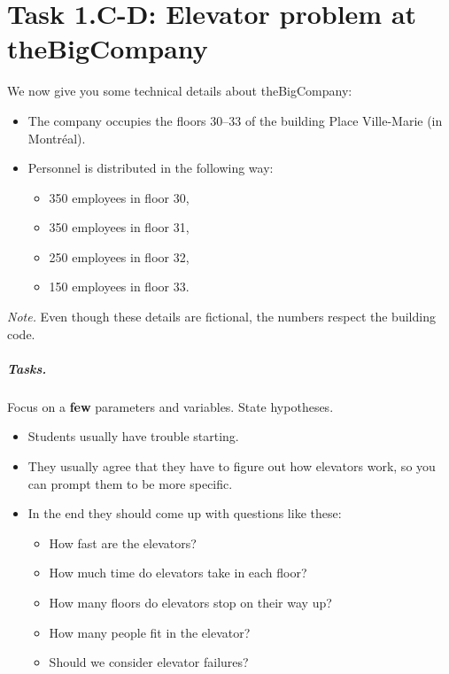 \vfill





\section*{Task 1.C-D: Elevator problem at theBigCompany}


We now give you some technical details about theBigCompany:


\begin{itemize}
	\item The company occupies the floors 30--33 of the building Place Ville-Marie (in Montr\'eal).

	\item Personnel is distributed in the following way: 
	\begin{itemize}
		\item 350 employees in floor 30,
		\item 350 employees in floor 31,
		\item 250 employees in floor 32, 
		\item 150 employees in floor 33.
	\end{itemize}
\end{itemize}

\textsl{Note.} Even though these details are fictional, the numbers respect the building code.


\subparagraph{Tasks.} Focus on a \textbf{few} parameters and variables. State hypotheses.

\begin{annotation}
	\begin{notes}
		\begin{itemize}
			\item Students usually have trouble starting. 
			\item They usually agree that they have to figure out how elevators work, so you can prompt them to be more specific. 
			
			\item In the end they should come up with questions like these:
			\begin{itemize}
				\item How fast are the elevators?
				\item How much time do elevators take in each floor?
				\item How many floors do elevators stop on their way up?
				\item How many people fit in the elevator?
				\item Should we consider elevator failures?
			\end{itemize}
		\end{itemize}	
	\end{notes}
\end{annotation}

